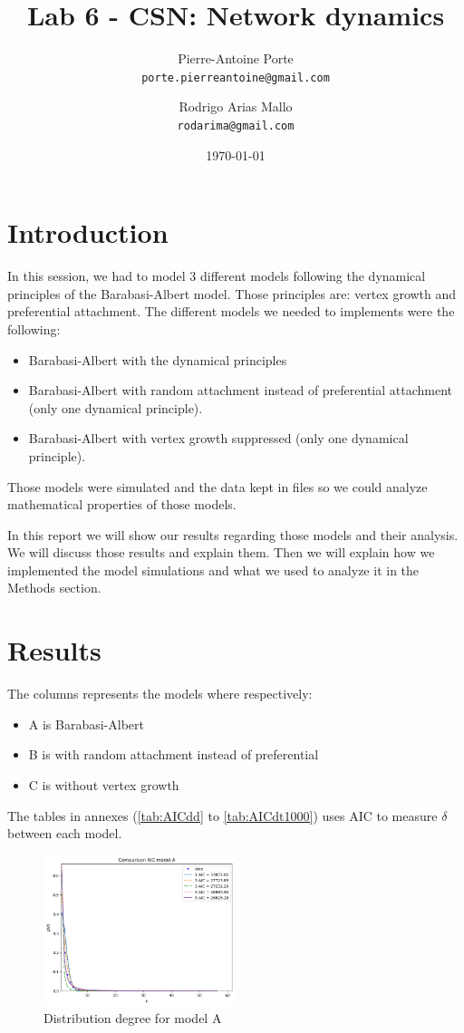 \documentclass{article}
\title{Lab 6 - CSN: Network dynamics}
\author{Pierre-Antoine Porte \\ \texttt{porte.pierreantoine@gmail.com}
\and Rodrigo Arias Mallo \\ \texttt{rodarima@gmail.com}}
\date{\today}
\begin{document}
\maketitle

\section{Introduction}

In this session, we had to model 3 different models following the dynamical
principles of the Barabasi-Albert model. Those principles are: vertex growth and
preferential attachment. The different models we needed to implements were the
following:

\begin{itemize}
	\item Barabasi-Albert with the dynamical principles
	\item Barabasi-Albert with random attachment instead of preferential
	attachment (only one dynamical principle).
	\item Barabasi-Albert with vertex growth suppressed (only one dynamical
	principle).
\end{itemize}

Those models were simulated and the data kept in files so we could analyze
mathematical properties of those models.

In this report we will show our results regarding those models and their
analysis. We will discuss those results and explain them. Then we will explain
how we implemented the model simulations and what we used to analyze it in the
Methods section.

\section{Results}

The columns represents the models where respectively:

\begin{itemize}
		\item A is Barabasi-Albert
		\item B is with random attachment instead of preferential
		\item C is without vertex growth
\end{itemize}

The tables in annexes (\ref{tab:AICdd} to \ref{tab:AICdt1000}) uses AIC to
measure $\delta$ between each model.

\begin{figure}[h]
    \centering
    \includegraphics[width=0.5\textwidth]{modelA/all_dd.png}
    \caption{Distribution degree for model A}
    \label{fig:all_dd_A}
\end{figure}
\end{document}

